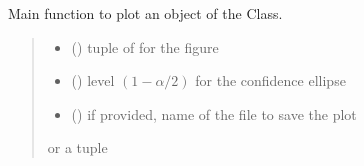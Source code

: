 \documentclass[letterpaper,10pt,english]{sphinxmanual}
\begin{document}
\begin{fulllineitems}
\begin{fulllineitems}
\label{\detokenize{cubmods:cubmods.cub.CUBresCUB00.plot}}
\pysigstartsignatures
{}
\pysigstopsignatures
\sphinxAtStartPar
Main function to plot an object of the Class.
\begin{quote}\begin{description}
\begin{itemize}
\item {} 
\sphinxAtStartPar
{} () \textendash{} tuple of  for the figure

\item {} 
\sphinxAtStartPar
{} () \textendash{} level \((1-\alpha/2)\) for the confidence ellipse

\item {} 
\sphinxAtStartPar
{} () \textendash{} if provided, name of the file to save the plot

\end{itemize}

\sphinxAtStartPar
{} or a tuple 

\end{description}\end{quote}

\end{fulllineitems}



\end{fulllineitems}
\end{document}
